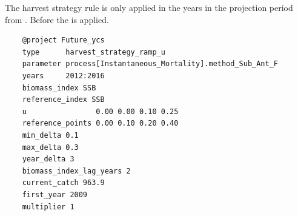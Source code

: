 The harvest strategy rule is only applied in the years in the projection period from . Before  the  is applied.

{\small{\begin{verbatim}
	@project Future_ycs
	type      harvest_strategy_ramp_u
	parameter process[Instantaneous_Mortality].method_Sub_Ant_F
	years     2012:2016
	biomass_index SSB
	reference_index SSB
	u                0.00 0.00 0.10 0.25
	reference_points 0.00 0.10 0.20 0.40 
	min_delta 0.1
	max_delta 0.3
	year_delta 3
	biomass_index_lag_years 2
	current_catch 963.9
	first_year 2009
	multiplier 1
\end{verbatim}}}
